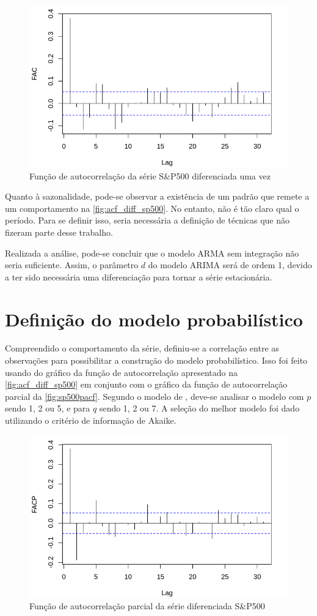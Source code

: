 \documentclass[
    12pt,
    oneside,
    a4paper,
    english,
    brazil
]{abntex2}
\begin{document}
\begin{figure}[ht]
    \centering
    \caption{Função de autocorrelação da série S\&P500 diferenciada uma vez}\label{fig:acf_diff_sp500}
    \includegraphics[width=.5\linewidth]{images/SP500_diff_FAC.png}
\end{figure}

Quanto à sazonalidade, pode-se observar a  existência de um padrão que remete a
um comportamento na  \autoref{fig:acf_diff_sp500}. No entanto, não  é tão claro
qual o período. Para se definir  isso, seria necessária a definição de técnicas
que não fizeram parte desse trabalho.

Realizada a  análise, pode-se  concluir que  o modelo  ARMA sem  integração não
seria  suficiente.  Assim, o  parâmetro  $d$  do  modelo  ARIMA será  de  ordem
1,  devido  a  ter  sido  necessária uma  diferenciação  para  tornar  a  série
estacionária.

\section{Definição do modelo probabilístico}

Compreendido  o  comportamento  da  série, definiu-se  a  correlação  entre  as
observações  para  possibilitar a  construção  do  modelo probabilístico.  Isso
foi  feito   usando  do  gráfico   da  função  de   autocorrelação  apresentado
na  \autoref{fig:acf_diff_sp500}  em  conjunto  com  o  gráfico  da  função  de
autocorrelação  parcial   da  \autoref{fig:sp500pacf}.  Segundo  o   modelo  de
, deve-se analisar o modelo com $p$ sendo 1, 2 ou 5, e para $q$
sendo 1, 2 ou  7. A seleção do melhor modelo foi dado  utilizando o critério de
informação de Akaike.

\begin{figure}[ht]
    \centering
    \caption{Função de autocorrelação parcial da série diferenciada S\&P500}\label{fig:sp500pacf}
    \includegraphics[width=.5\linewidth]{images/SP500_diff_FACP.png}
\end{figure}
\end{document}
